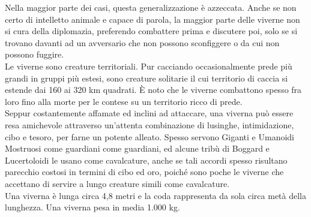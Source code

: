\begin{multicols}{2}
Nella maggior parte dei casi, questa generalizzazione è azzeccata. Anche se non certo di intelletto animale e capace di parola, la maggior parte delle viverne non si cura della diplomazia, preferendo combattere prima e discutere poi, solo se si trovano davanti ad un avversario che non possono sconfiggere o da cui non possono fuggire.\\

Le viverne sono creature territoriali. Pur cacciando occasionalmente prede più grandi in gruppi più estesi, sono creature solitarie il cui territorio di caccia si estende dai 160 ai 320 km quadrati. È noto che le viverne combattono spesso fra loro fino alla morte per le contese su un territorio ricco di prede.\\


Seppur costantemente affamate ed inclini ad attaccare, una viverna può essere resa amichevole attraverso un'attenta combinazione di lusinghe, intimidazione, cibo e tesoro, per farne un potente alleato. Spesso servono Giganti e Umanoidi Mostruosi come guardiani come guardiani, ed alcune tribù di Boggard e Lucertoloidi le usano come cavalcature, anche se tali accordi spesso risultano parecchio costosi in termini di cibo ed oro, poiché sono poche le viverne che accettano di servire a lungo creature simili come cavalcature.\\

Una viverna è lunga circa 4,8 metri e la coda rappresenta da sola circa metà della lunghezza. Una viverna pesa in media 1.000 kg.\\


\end{multicols}
